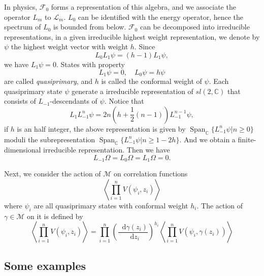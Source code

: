 \documentclass[10pt,reqno,draft]{article}
\newcommand{\dd}{\mathop{}\!\mathrm{d}}
\numberwithin{equation}{section}
\numberwithin{figure}{section}
\numberwithin{table}{section}
\theoremstyle{plain}
\theoremstyle{definition}
\theoremstyle{remark}
\begin{document}
	In physics, \(\mathcal{F}_{0}\) forms a representation of this algebra, and we associate the operator \(L_{m}\) to \(\mathcal{L}_{m}\). \(L_{0}\) can be identified with the energy operator, hence the spectrum of \(L_{0}\) is bounded from below. \(\mathcal{F}_{0}\) can be decomposed into irreducible representations, in a given irreducible highest weight representation, we denote by \(\psi\) the highest weight vector with weight \(h\). Since 
	\begin{equation}
	  L_{0}L_{1}\psi=\left( h-1 \right) L_{1}\psi,
	\end{equation}
	we have \(L_{1}\psi=0\). States with property 
	\begin{equation}
	  L_1\psi=0,\quad L_0\psi=h\psi
	\end{equation}
	are called \emph{quasiprimary}, and \(h\) is called the conformal weight of \(\psi\). Each quasiprimary state \(\psi\) generate a irreducible representation of \(sl(2,\mathbb{C})\) that consists of \(L_{-1}\)-descendants of \(\psi\). Notice that 
	\begin{equation}
	  L_1L_{-1}^{n}\psi=2n\left( h+\frac{1}{2}(n-1) \right) L_{-1}^{n-1}\psi,
	\end{equation}
	if \(h\) is an half integer, the above representation is given by \(\operatorname{ Span }_{\mathbb{C}}\{L_{-1}^{n}\psi|n\ge 0\} \) moduli the subrepresentation \(\operatorname{ Span } _{\mathbb{C}}\{L_{-1}^{n}\psi|n\ge 1-2h\} \). And we obtain a finite-dimensional irreducible representation. Then we have
	\begin{equation}
	  L_{-1}\Omega=L_{0}\Omega=L_1\Omega=0.
	\end{equation}

	Next, we consider the action of \(\mathcal{M}\) on correlation functions 
	\begin{equation}
	  \left<\prod_{i=1}^{n} V\left( \psi_{i},z_{i} \right)   \right>
	\end{equation}
	where \(\psi_{i}\) are all quasiprimary states with conformal weight \(h_{i}\). The action of \(\gamma\in \mathcal{M}\) on it is defined by 
	\begin{equation}
	  \left<\prod_{i=1}^{n} V\left( \psi_{i},z_{i} \right)   \right>=\prod_{i=1}^{n} \left( \frac{\dd \gamma\left( z_{i} \right) }{\dd z_{i}} \right)^{h_{i}} \left<\prod_{i=1}^{n} V\left( \psi_{i},\gamma\left( z_{i} \right) \right)   \right>
	\end{equation}
  
  \subsection{Some examples}
\end{document}
